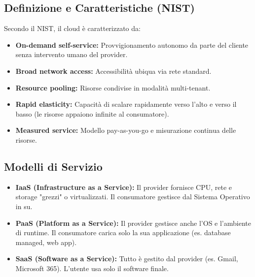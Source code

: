 \subsection{Definizione e Caratteristiche (NIST)}
Secondo il NIST, il cloud è caratterizzato da:
\begin{itemize}
    \item \textbf{On-demand self-service:} Provvigionamento autonomo da parte del cliente senza intervento umano del provider.
    \item \textbf{Broad network access:} Accessibilità ubiqua via rete standard.
    \item \textbf{Resource pooling:} Risorse condivise in modalità multi-tenant.
    \item \textbf{Rapid elasticity:} Capacità di scalare rapidamente verso l'alto e verso il basso (le risorse appaiono infinite al consumatore).
    \item \textbf{Measured service:} Modello pay-as-you-go e misurazione continua delle risorse.
\end{itemize}

\subsection{Modelli di Servizio}
\begin{itemize}
    \item \textbf{IaaS (Infrastructure as a Service):} Il provider fornisce CPU, rete e storage "grezzi" o virtualizzati. Il consumatore gestisce dal Sistema Operativo in su.
    \item \textbf{PaaS (Platform as a Service):} Il provider gestisce anche l'OS e l'ambiente di runtime. Il consumatore carica solo la sua applicazione (es. database managed, web app).
    \item \textbf{SaaS (Software as a Service):} Tutto è gestito dal provider (es. Gmail, Microsoft 365). L'utente usa solo il software finale.
\end{itemize}

